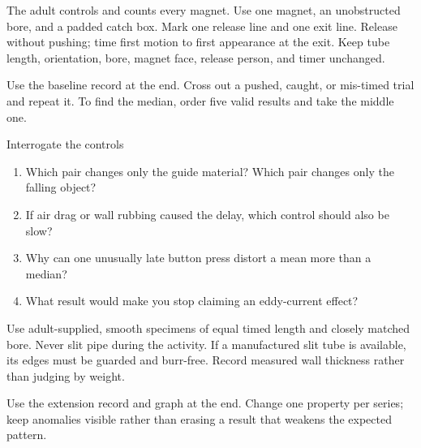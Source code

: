 The adult controls and counts every magnet. Use one magnet, an unobstructed bore,
and a padded catch box. Mark one release line and one exit line. Release without
pushing; time first motion to first appearance at the exit. Keep tube length,
orientation, bore, magnet face, release person, and timer unchanged.

Use the baseline record at the end. Cross out a pushed, caught, or mis-timed
trial and repeat it. To find the median, order five valid results and take the
middle one.

\begin{telospanel}{Interrogate the controls}
\begin{enumerate}
\item Which pair changes only the guide material? Which pair changes only the
falling object?
\item If air drag or wall rubbing caused the delay, which control should also
be slow?
\item Why can one unusually late button press distort a mean more than a median?
\item What result would make you stop claiming an eddy-current effect?
\end{enumerate}
\end{telospanel}

Use adult-supplied, smooth specimens of equal timed length and closely matched
bore. Never slit pipe during the activity. If a manufactured slit tube is
available, its edges must be guarded and burr-free. Record measured wall
thickness rather than judging by weight.

Use the extension record and graph at the end. Change one property per series;
keep anomalies visible rather than erasing a result that weakens the expected
pattern.

\begin{telosfacts}[0.22]
\end{telosfacts}

